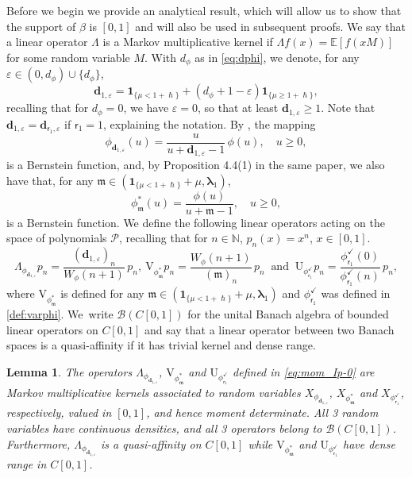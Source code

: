 \documentclass[JEP,XML,SOM,Unicode]{cedram}
\let\epsilon\varepsilon
\theoremstyle{plain}
\newtheorem{lemma}[theorem]{Lemma}
\theoremstyle{definition}
\newcommand{\E}{\mathbb{E}}
\newcommand{\N}{\mathbb{N}}
\newcommand{\Poly}{\mathscr{P}}
\newcommand{\m}{\mathfrak{m}}
\newcommand{\dpt}{\bm{d}_{\vat,\epsilon}}
\newcommand{\dph}{(d_\phi+1-\epsilon)}
\newcommand{\dz}{{\bm{d}}_{1,\epsilon}}
\newcommand{\Bo}[1]{\mathcal{B}(#1)}
\newcommand{\lam}{{\bm{\lambda}_1}}
\newcommand{\vat}{{\mathsf{r}_1}}
\newcommand{\phm}{{\phi_\m^*}}
\renewcommand{\varphi}{{\phi_{\vat}^{\checkmark}}}
\let\h\hslash
\let\mo\mu
\let\bpsi\beta
\begin{document}
Before we begin we provide an analytical result, which will allow us to show that the support of $\bpsi$ is $[0,1]$ and will also be used in subsequent proofs. We say that a linear operator $\Lambda$ is a Markov multiplicative kernel if $\Lambda f(x) = \E[f(xM)]$ for some random variable $M$. With $d_\phi$ as in \eqref{eq:dphi}, we denote, for any $\epsilon \in (0,d_\phi) \cup \{d_\phi\}$,
\begin{equation}
\label{eq:defn-d0}
\dz = \bm{1}_{\{ \mo < 1+\h \}} + \dph\bm{1}_{\{ \mo \geq 1+\h \}},
\end{equation}
recalling that for $d_\phi =0$, we have $\epsilon = 0$, so that at least $\dz \geq 1$. Note that $\dz=\dpt$ if $\vat=1$, explaining the notation. By \cite[Lem.\,10.3]{Patie-Savov-GeL}, the mapping
\begin{equation}
\label{eq:defphi-d0}
\phi_{\dz}(u)=\frac{u}{u+\dz-1}\,\phi(u), \quad u \ge 0,
\end{equation}
is a Bernstein function, and, by Proposition 4.4(1) in the same paper, we also have that, for
any $\m \in (\bm{1}_{\{\mo < 1+\h\}} + \mo, \lam)$,
\begin{equation}
\label{eq:def-phi-m}
\phm(u) = \frac{\phi(u)}{u+\m-1}, \quad u \ge 0,
\end{equation}
is a Bernstein function. We define the following linear operators acting on the space of polynomials $\Poly$, recalling
that for $n \in \N$, $p_n(x) = x^n$, $x \in [0,1]$.
\begin{equation}
\label{eq:mom_Ip-0}
\Lambda_{\phi_{\dz}}p_n = \frac{(\dz)_n}{W_\phi(n+1)}\,p_n, \:
\mathrm{V}_{\phm} p_n = \frac{W_{\phi}(n+1)}{(\m)_n}\,p_n \: \textrm{ and } \:
\mathrm{U}_\varphi p_n = \frac{\varphi(0)}{\varphi(n)}\,p_n,
\end{equation}
where $\mathrm{V}_{\phm}$ is defined for any $\m \in (\bm{1}_{\{\mo < 1+\h\}} + \mo, \lam)$ and $\varphi$ was defined in \eqref{def:varphi}. We~write $\Bo{C[0,1]}$ for the unital Banach algebra of bounded linear operators on $C[0,1]$ and say that a linear operator between two Banach spaces is a quasi-affinity if it has trivial kernel and dense range.

\begin{lemma}
\label{lem:Markov-kernel}
The operators $\Lambda_{\phi_{\dz}}$, $\mathrm{V}_{\phm}$ and $\mathrm{U}_{\varphi}$ defined in \eqref{eq:mom_Ip-0} are Markov multiplicative kernels associated to random variables $X_{\phi_{\dz}}$, $X_{\phm}$ and $X_{\varphi}$, respectively, valued in $[0,1]$, and hence moment determinate. All 3 random variables have continuous densities, and all 3 operators belong to $\Bo{C[0,1]}$. Furthermore, $\Lambda_{\phi_{\dz}}$ is a quasi-affinity on $C[0,1]$ while $\mathrm{V}_{\phm}$ and $\mathrm{U}_{\varphi}$ have dense range in $C[0,1]$.
\end{lemma}
\end{document}
